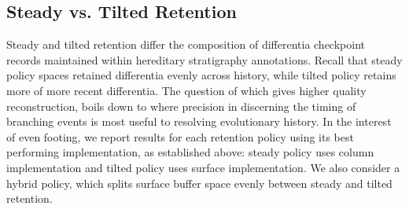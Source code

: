 



\subsection{Steady vs. Tilted Retention} \label{sec:steady-vs-tilted}



Steady and tilted retention differ the composition of differentia checkpoint records maintained within hereditary stratigraphy annotations.
Recall that steady policy spaces retained differentia evenly across history, while tilted policy retains more of more recent differentia.
The question of which gives higher quality reconstruction, boils down to where precision in discerning the timing of branching events is most useful to resolving evolutionary history.
In the interest of even footing, we report results for each retention policy using its best performing implementation, as established above: steady policy uses column implementation and tilted policy uses surface implementation.
We also consider a hybrid policy, which splits surface buffer space evenly between steady and tilted retention.

